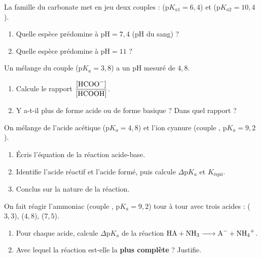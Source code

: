 \documentclass[11pt,a4paper]{article}
\begin{document}

\begin{exo}
La famille du carbonate met en jeu deux couples :  ($\mathrm{p}K_{a1} = 6{,}4$) et
 ($\mathrm{p}K_{a2} = 10{,}4$).
\begin{enumerate}[label=\alph*)]
  \item Quelle espèce prédomine à $\mathrm{pH} = 7{,}4$ (pH du sang) ?
  \item Quelle espèce prédomine à $\mathrm{pH} = 11$ ?
\end{enumerate}
\end{exo}

\begin{exo}
Un mélange du couple  ($\mathrm{p}K_a = 3{,}8$) a un pH mesuré de $4{,}8$.
\begin{enumerate}[label=\alph*)]
  \item Calcule le rapport $\dfrac{[\ce{HCOO-}]}{[\ce{HCOOH}]}$.
  \item Y a-t-il plus de forme acide ou de forme basique ? Dans quel rapport ?
\end{enumerate}
\end{exo}

\begin{exo}
On mélange de l'acide acétique  ($\mathrm{p}K_a = 4{,}8$) et l'ion cyanure  (couple
, $\mathrm{p}K_a = 9{,}2$).
\begin{enumerate}[label=\alph*)]
  \item Écris l'équation de la réaction acide-base.
  \item Identifie l'acide réactif et l'acide formé, puis calcule $\Delta\mathrm{p}K_a$ et $K_{\text{équi}}$.
  \item Conclus sur la nature de la réaction.
\end{enumerate}
\end{exo}

\begin{exo}
On fait réagir l'ammoniac  (couple , $\mathrm{p}K_a = 9{,}2$) tour à tour avec trois
acides :  ($3{,}3$),  ($4{,}8$),  ($7{,}5$).
\begin{enumerate}[label=\alph*)]
  \item Pour chaque acide, calcule $\Delta\mathrm{p}K_a$ de la réaction $\ce{HA + NH3 -> A- + NH4+}$.
  \item Avec lequel la réaction est-elle la \textbf{plus complète} ? Justifie.
\end{enumerate}
\end{exo}
\end{document}
